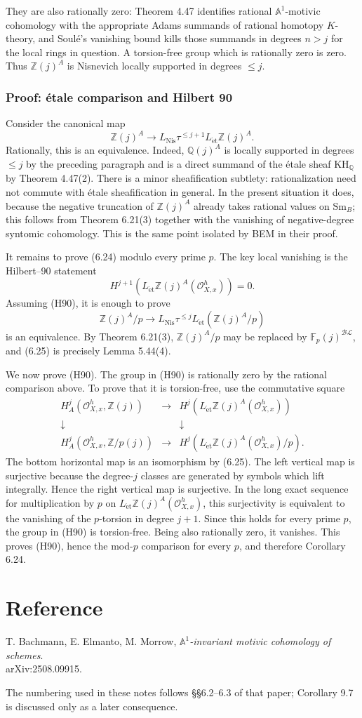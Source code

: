 \documentclass[11pt,a4paper]{article}
\newcommand{\Z}{\mathbb Z}
\newcommand{\Q}{\mathbb Q}
\newcommand{\F}{\mathbb F}
\newcommand{\Aone}{\mathbb A^1}
\newcommand{\Sm}{\mathrm{Sm}}
\newcommand{\Nis}{\mathrm{Nis}}
\newcommand{\et}{\mathrm{\acute et}}
\newcommand{\BL}{\mathcal{BL}}
\newcommand{\KH}{\mathrm{KH}}
\newcommand{\1}{\mathbf 1}
\newcommand{\calO}{\mathcal O}
\theoremstyle{bemstyle}
\theoremstyle{definition}
\begin{document}
They are also rationally zero: Theorem 4.47 identifies rational \(\Aone\)-motivic cohomology with the appropriate Adams summands of rational homotopy \(K\)-theory, and Soulé's vanishing bound kills those summands in degrees \(n>j\) for the local rings in question. A torsion-free group which is rationally zero is zero. Thus \(\Z(j)^A\) is Nisnevich locally supported in degrees \(\leq j\).

\subsubsection{Proof: \'etale comparison and Hilbert 90}

Consider the canonical map
\[
       \Z(j)^A\longrightarrow L_{\Nis}\tau^{\leq j+1}L_{\et}\Z(j)^A. \tag{6.24}
\]
Rationally, this is an equivalence. Indeed, \(\Q(j)^A\) is locally supported in degrees \(\leq j\) by the preceding paragraph and is a direct summand of the \'etale sheaf \(\KH_{\Q}\) by Theorem 4.47(2). There is a minor sheafification subtlety: rationalization need not commute with \'etale sheafification in general. In the present situation it does, because the negative truncation of \(\Z(j)^A\) already takes rational values on \(\Sm_B\); this follows from Theorem 6.21(3) together with the vanishing of negative-degree syntomic cohomology. This is the same point isolated by BEM in their proof.

It remains to prove (6.24) modulo every prime \(p\). The key local vanishing is the Hilbert--90 statement
\[
       H^{j+1}\!\left(L_{\et}\Z(j)^A(\calO^h_{X,x})\right)=0. \tag{H90}
\]
Assuming (H90), it is enough to prove
\[
       \Z(j)^A/p
       \longrightarrow
       L_{\Nis}\tau^{\leq j}L_{\et}(\Z(j)^A/p) \tag{6.25}
\]
is an equivalence. By Theorem 6.21(3), \(\Z(j)^A/p\) may be replaced by \(\F_p(j)^{\BL}\), and (6.25) is precisely Lemma 5.44(4).

We now prove (H90). The group in (H90) is rationally zero by the rational comparison above. To prove that it is torsion-free, use the commutative square
\[
\begin{array}{ccc}
H_A^j(\calO^h_{X,x},\Z(j))
& \longrightarrow &
H^j(L_{\et}\Z(j)^A(\calO^h_{X,x})) \\
\downarrow && \downarrow \\
H_A^j(\calO^h_{X,x},\Z/p(j))
& \longrightarrow &
H^j(L_{\et}\Z(j)^A(\calO^h_{X,x})/p).
\end{array}
\]
The bottom horizontal map is an isomorphism by (6.25). The left vertical map is surjective because the degree-\(j\) classes are generated by symbols which lift integrally. Hence the right vertical map is surjective. In the long exact sequence for multiplication by \(p\) on \(L_{\et}\Z(j)^A(\calO^h_{X,x})\), this surjectivity is equivalent to the vanishing of the \(p\)-torsion in degree \(j+1\). Since this holds for every prime \(p\), the group in (H90) is torsion-free. Being also rationally zero, it vanishes. This proves (H90), hence the mod-\(p\) comparison for every \(p\), and therefore Corollary 6.24.

\section*{Reference}
T. Bachmann, E. Elmanto, M. Morrow, \emph{\(\mathbb A^1\)-invariant motivic cohomology of schemes}.\\
arXiv:2508.09915.

The numbering used in these notes follows \S\S6.2--6.3 of that paper; Corollary 9.7 is discussed only as a later consequence.
\end{document}
